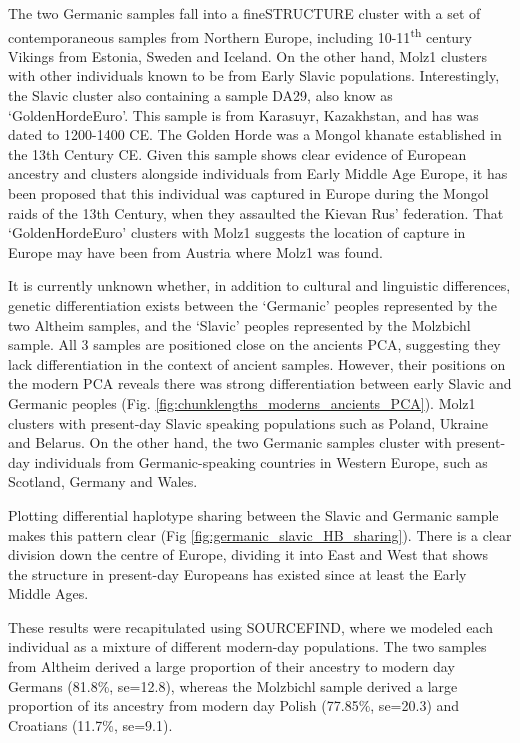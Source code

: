 The two Germanic samples fall into a fineSTRUCTURE cluster with a set of contemporaneous samples from Northern Europe, including 10-11\textsuperscript{th} century Vikings from Estonia, Sweden and Iceland. On the other hand, Molz1 clusters with other individuals known to be from Early Slavic populations. Interestingly, the Slavic cluster also containing a sample DA29, also know as `GoldenHordeEuro'. This sample is from Karasuyr, Kazakhstan, and has was dated to 1200-1400 CE. The Golden Horde was a Mongol khanate established in the 13th Century CE. Given this sample shows clear evidence of European ancestry and clusters alongside individuals from Early Middle Age Europe, it has been proposed that this individual was captured in Europe during the Mongol raids of the 13th Century, when they assaulted the Kievan Rus' federation. That `GoldenHordeEuro' clusters with Molz1 suggests the location of capture in Europe may have been from Austria where Molz1 was found. 

It is currently unknown whether, in addition to cultural and linguistic differences, genetic differentiation exists between the `Germanic’ peoples represented by the two Altheim samples, and the `Slavic’ peoples represented by the Molzbichl sample. All 3 samples are positioned close on the ancients PCA, suggesting they lack differentiation in the context of ancient samples. However, their positions on the modern PCA reveals there was strong differentiation between early Slavic and Germanic peoples (Fig. \ref{fig:chunklengths_moderns_ancients_PCA}). Molz1 clusters with present-day Slavic speaking populations such as Poland, Ukraine and Belarus. On the other hand, the two Germanic samples cluster with present-day individuals from Germanic-speaking countries in Western Europe, such as Scotland, Germany and Wales. 

Plotting differential haplotype sharing between the Slavic and Germanic sample makes this pattern clear (Fig \ref{fig:germanic_slavic_HB_sharing}). There is a clear division down the centre of Europe, dividing it into East and West that shows the structure in present-day Europeans has existed since at least the Early Middle Ages. 

These results were recapitulated using SOURCEFIND, where we modeled each individual as a mixture of different modern-day populations. The two samples from Altheim derived a large proportion of their ancestry to modern day Germans (81.8\%, se=12.8), whereas the Molzbichl sample derived a large proportion of its ancestry from modern day Polish (77.85\%, se=20.3) and Croatians (11.7\%, se=9.1). 

